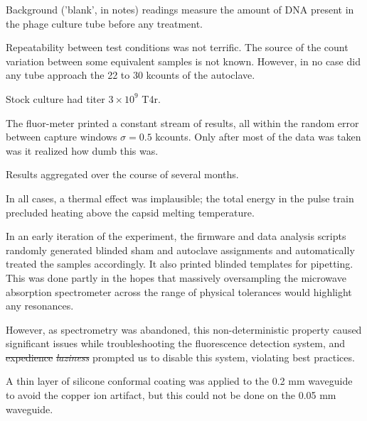 \documentclass[paper.tex]{subfiles}
\begin{document}
Background ('blank', in notes) readings measure the amount of DNA present in the phage culture tube before any treatment.

Repeatability between test conditions was not terrific. The source of the  count variation between some equivalent samples is not known. However, in no case did any tube approach the 22 to 30 kcounts of the autoclave.

Stock culture had titer $3\times 10^9$ T4r.

The fluor-meter printed a constant stream of results, all within the random error between capture windows $\sigma=0.5$ kcounts. Only after most of the data was taken was it realized how dumb this was.

Results aggregated over the course of several months.

In all cases, a thermal effect was implausible; the total energy in the pulse train precluded heating above the capsid melting temperature.\cite{Effects1951}

In an early iteration of the experiment, the firmware and data analysis scripts randomly generated blinded sham and autoclave assignments and automatically treated the samples accordingly. It also printed blinded templates for pipetting. This was done partly in the hopes that massively oversampling the microwave absorption spectrometer across the range of physical tolerances would highlight any resonances.\cite{first2000} 

However, as spectrometry was abandoned, this non-deterministic property caused significant issues while troubleshooting the fluorescence detection system, and \st{expedience} \st{\textit{laziness}} prompted us to disable this system, violating best practices.

A thin layer of silicone conformal coating was applied to the 0.2 mm waveguide to avoid the copper ion artifact, but this could not be done on the 0.05 mm waveguide.
\end{document}
